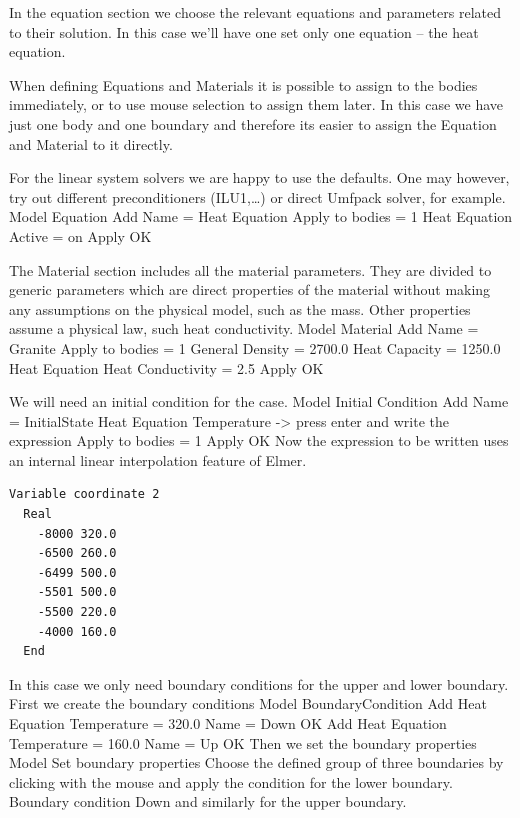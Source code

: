 In the equation section we choose the relevant equations and parameters related to their solution. 
In this case we'll have one set only one equation -- the heat equation.


When defining Equations and Materials it is possible to assign to the bodies immediately, or to use mouse
selection to assign them later. In this case we have just one body and one boundary and therefore its easier to assign 
the Equation and Material to it directly.

For the linear system solvers we are happy to use the defaults. One may however, try out different
preconditioners (ILU1,\ldots) or direct Umfpack solver, for example.
\ttbegin
Model
  Equation
    Add 
      Name = Heat Equation
      Apply to bodies = 1
      Heat Equation
        Active = on
  Apply   
  OK
\ttend        

The Material section includes all the material parameters.
They are divided to generic parameters which are direct properties of the material
without making any assumptions on the physical model, such as the mass. Other properties assume
a physical law, such heat conductivity.
\ttbegin
Model
  Material
    Add 
      Name = Granite
      Apply to bodies = 1 
      General    
        Density = 2700.0
        Heat Capacity = 1250.0
      Heat Equation
        Heat Conductivity = 2.5
    Apply
    OK
\ttend

We will need an initial condition for the case. 
\ttbegin
Model
  Initial Condition
    Add 
      Name = InitialState
      Heat Equation
        Temperature -> press enter and write the expression
      Apply to bodies = 1
    Apply
    OK
\ttend    
Now the expression to be written uses an internal linear interpolation feature of Elmer. 
\begin{verbatim}
Variable coordinate 2
  Real
    -8000 320.0
    -6500 260.0
    -6499 500.0
    -5501 500.0
    -5500 220.0
    -4000 160.0
  End
\end{verbatim}

In this case we only need boundary conditions for the upper and lower boundary.
First we create the boundary conditions
\ttbegin
Model
  BoundaryCondition
    Add 
      Heat Equation
        Temperature = 320.0
      Name = Down
      OK
    Add 
      Heat Equation
        Temperature = 160.0
      Name = Up
      OK
\ttend   
Then we set the boundary properties 
\ttbegin
Model 
  Set boundary properties  
\ttend
Choose the defined group of three boundaries by clicking with the mouse
and apply the condition for the lower boundary.
\ttbegin
Boundary condition
  Down
\ttend
and similarly for the upper boundary. 


